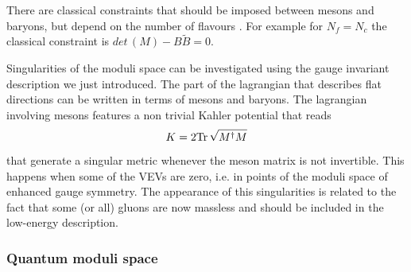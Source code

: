 There are classical constraints that should be imposed between mesons and baryons, but depend on the number of flavours .
For example for $N_f = N_c$ the classical constraint  is $ det \,( M) - B \tilde{B} = 0$.

Singularities of the moduli space can be investigated using the gauge invariant description we just introduced.
The part of the lagrangian that describes flat directions can be written in terms of mesons and baryons. 
The lagrangian involving mesons features a non trivial Kahler potential that reads
\begin{equation}
  K = 2 \mathrm{Tr } \, \sqrt{ M^{\dagger} M}
 \end{equation} 
that generate a singular metric whenever the meson matrix is not invertible. 
This happens when some of the VEVs are zero, i.e. in points of the moduli space of enhanced gauge symmetry.
The appearance of this singularities is related to the fact that
some (or all) gluons are now massless and should be included in the low-energy description.




\subsubsection{Quantum moduli space}

